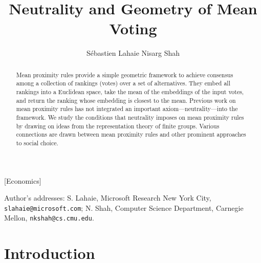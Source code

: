 \documentclass[prodmode,acmec]{ec-acmsmall}
\begin{document}
\allowdisplaybreaks


\title{Neutrality and Geometry of Mean Voting}
\author{
S\'{e}bastien Lahaie
Nisarg Shah
}

\begin{abstract}
Mean proximity rules provide a simple geometric framework to achieve consensus among a collection of rankings (votes) over a set of alternatives. They embed all rankings into a Euclidean space, take the mean of the embeddings of the input votes, and return the ranking whose embedding is closest to the mean. Previous work on mean proximity rules has not integrated an important axiom---neutrality---into the framework. We study the conditions that neutrality imposes on mean proximity rules by drawing on ideas from the representation theory of finite groups. Various connections are drawn between mean proximity rules and other prominent approaches to social choice.
\end{abstract}

[Economics]




\begin{bottomstuff}
Author's addresses:  S. Lahaie, Microsoft Research New York City, {\small\tt slahaie@microsoft.com}; N. Shah, Computer Science Department, Carnegie Mellon, {\small\tt nkshah@cs.cmu.edu}.
\end{bottomstuff}

\maketitle

\section{Introduction}
\label{sec:intro}
\end{document}
